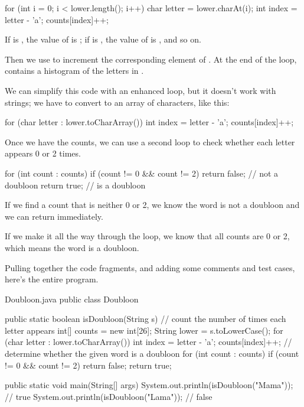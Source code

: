 \begin{code}
for (int i = 0; i < lower.length(); i++) {
    char letter = lower.charAt(i);
    int index = letter - 'a';
    counts[index]++;
}
\end{code}

If  is , the value of  is ;
if  is , the value of  is ,
and so on.

Then we use  to increment the corresponding element of .
At the end of the loop,  contains a histogram of the letters in .


We can simplify this code with an enhanced  loop, but it doesn't work with strings; we have to convert  to an array of characters, like this:

\begin{code}
for (char letter : lower.toCharArray()) {
    int index = letter - 'a';
    counts[index]++;
}
\end{code}

Once we have the counts, we can use a second  loop to check whether each letter appears 0 or 2 times.

\begin{code}
for (int count : counts) {
    if (count != 0 && count != 2) {
        return false;  // not a doubloon
    }
}
return true;  // is a doubloon
\end{code}

If we find a count that is neither 0 or 2, we know the word is not a doubloon and we can return immediately.

If we make it all the way through the  loop, we know that all counts are 0 or 2, which means the word is a doubloon.

Pulling together the code fragments, and adding some comments and test cases, here's the entire program.


\begin{trinket}{Doubloon.java}
public class Doubloon {

    public static boolean isDoubloon(String s) {
        // count the number of times each letter appears
        int[] counts = new int[26];
        String lower = s.toLowerCase();
        for (char letter : lower.toCharArray()) {
            int index = letter - 'a';
            counts[index]++;
        }
        // determine whether the given word is a doubloon
        for (int count : counts) {
            if (count != 0 && count != 2) {
                return false;
            }
        }
        return true;
    }

    public static void main(String[] args) {
        System.out.println(isDoubloon("Mama"));  // true
        System.out.println(isDoubloon("Lama"));  // false
    }
}
\end{trinket}

